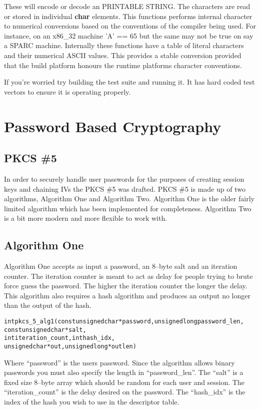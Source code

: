 \documentclass[a4paper]{book}
\begin{document}
These will encode or decode an PRINTABLE STRING.  The characters are read or stored in individual \textbf{char} elements.  This functions performs internal character
to numerical conversions based on the conventions of the compiler being used.  For instance, on an x86\_32 machine 'A' == 65 but the same may not be true on 
say a SPARC machine.  Internally these functions have a table of literal characters and their numerical ASCII values.  This provides a stable conversion provided
that the build platform honours the runtime platforms character conventions.

If you're worried try building the test suite and running it.  It has hard coded test vectors to ensure it is operating properly. 


\section{Password Based Cryptography}
\subsection{PKCS \#5}
In order to securely handle user passwords for the purposes of creating session keys and chaining IVs the PKCS \#5 was drafted.   PKCS \#5
is made up of two algorithms, Algorithm One and Algorithm Two.  Algorithm One is the older fairly limited algorithm which has been implemented
for completeness.  Algorithm Two is a bit more modern and more flexible to work with.

\subsection{Algorithm One}
Algorithm One accepts as input a password, an 8--byte salt and an iteration counter.  The iteration counter is meant to act as delay for
people trying to brute force guess the password.  The higher the iteration counter the longer the delay.  This algorithm also requires a hash 
algorithm and produces an output no longer than the output of the hash.  

\begin{alltt}
int pkcs_5_alg1(const unsigned char *password, unsigned long password_len, 
                const unsigned char *salt, 
                int iteration_count,  int hash_idx,
                unsigned char *out,   unsigned long *outlen)
\end{alltt}
Where ``password'' is the users password.  Since the algorithm allows binary passwords you must also specify the length in ``password\_len''.  
The ``salt'' is a fixed size 8--byte array which should be random for each user and session.  The ``iteration\_count'' is the delay desired
on the password.  The ``hash\_idx'' is the index of the hash you wish to use in the descriptor table.  
\end{document}

